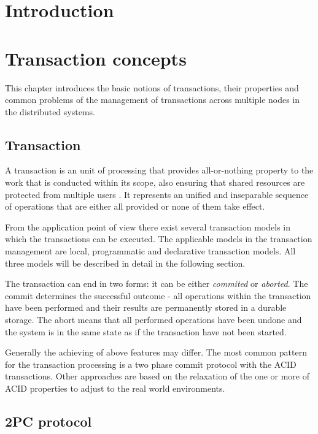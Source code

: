 \documentclass[oneside,
  digital, %
  table,   %
  nolof,     %
  nolot,     %
]{fithesis3}
\begin{document}
\chapter{Introduction}

\clearpage
\chapter{Transaction concepts}

This chapter introduces the basic notions of transactions, their properties and common problems of the management of transactions across multiple nodes in the distributed systems. 

\section{Transaction}

A transaction is an unit of processing that provides all-or-nothing property to the work that is conducted within its scope, also ensuring that shared resources are protected from multiple users \cite{java_tran_processing}. It represents an unified and inseparable sequence of operations that are either all provided or none of them take effect. 

From the application point of view there exist several transaction models in which the transactions can be executed. The applicable models in the transaction management are local, programmatic and declarative transaction models. All three models will be described in detail in the following section.

The transaction can end in two forms: it can be either \textit{commited} or \textit{aborted}. The commit determines the successful outcome - all operations within the transaction have been performed and their results are permanently stored in a durable storage. The abort means that all performed operations have been undone and the system is in the same state as if the transaction have not been started.

Generally the achieving of above features may differ. The most common pattern for the transaction processing is a two phase commit protocol with the ACID transactions. Other approaches are based on the relaxation of the one or more of ACID properties to adjust to the real world environments.

\section{2PC protocol}
\end{document}
